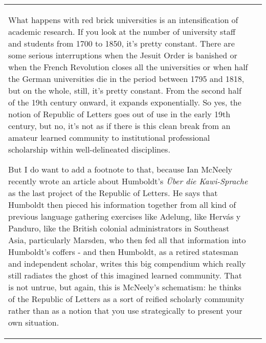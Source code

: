 \documentclass[12pt]{article}
\begin{document}
\begin{flushleft}
\begin{supertabular}{m{0.24415985in}m{5.89766in}}
What happens with red brick universities is an intensification of academic research. If you look at the number of university staff and students from 1700 to 1850, it’s pretty constant. There are some serious interruptions when the Jesuit Order is banished or when the French Revolution closes all the universities or when half the German universities die in the period between 1795 and 1818, but on the whole, still, it’s pretty constant. From the second half of the 19th century onward, it expands exponentially. So yes, the notion of Republic of Letters goes out of use in the early 19th century, but no, it’s not as if there is this clean break from an amateur learned community to institutional professional scholarship within well-delineated disciplines. 

But I do want to add a footnote to that, because Ian McNeely recently wrote an article about Humboldt’s \textit{Über die Kawi-Sprache} as the last project of the Republic of Letters. He says that Humboldt then pieced his information together from all kind of previous language gathering exercises like Adelung, like Hervás y Panduro, like the British colonial administrators in Southeast Asia, particularly Marsden, who then fed all that information into Humboldt’s coffers - and then Humboldt, as a retired statesman and independent scholar, writes this big compendium which really still radiates the ghost of this imagined learned community. That is not untrue, but again, this is McNeely’s schematism: he thinks of the Republic of Letters as a sort of reified scholarly community rather than as a notion that you use strategically to present your own situation. 


\end{supertabular}
\end{flushleft}
\end{document}
